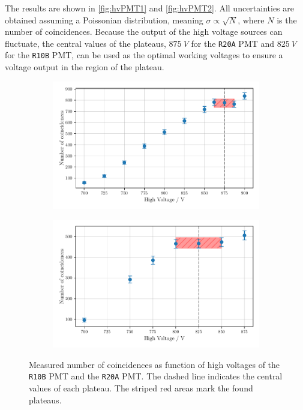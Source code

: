 The results are shown in \autoref{fig:hvPMT1} and \autoref{fig:hvPMT2}. All uncertainties are obtained 
assuming a Poissonian distribution, meaning $\sigma \propto \sqrt{N}$, where $N$ is the number of
coincidences. Because the output of the high voltage sources can fluctuate, the central values of the plateaus, $\SI{875}{V}$ for the \texttt{R20A} PMT and 
$\SI{825}{V}$ for the \texttt{R10B} PMT, can be used as the optimal working voltages to ensure
a voltage output in the region of the plateau.

\begin{figure}
        \centering
        \begin{subfigure}[b]{0.48\textwidth}
        \includegraphics[width=\textwidth]{plots/hvR20A.pdf}
        \label{fig:hvPMT1}
    \end{subfigure}\hfill
\begin{subfigure}[b]{0.48\textwidth}
        \includegraphics[width=\textwidth]{plots/hvR10B.pdf}
        \label{fig:hvPMT2}
\end{subfigure}
\caption{Measured number of coincidences as function of high voltages
of the \texttt{R10B} PMT and the \texttt{R20A} PMT.
The dashed line indicates the central values of each plateau. The striped red areas mark the found plateaus.}
\label{fig:hv}
\end{figure}


